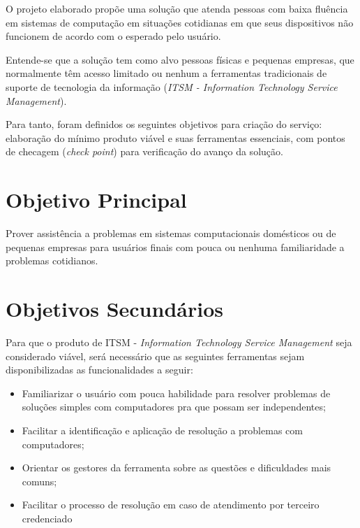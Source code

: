 \documentclass[
    12pt,               %
    openright,          %
    oneside,
    a4paper,            %
    english,            %
    brazil              %
   ]{ifsp-spo-inf-ctds}
\begin{document}
	O projeto elaborado propõe uma solução que atenda pessoas com baixa fluência em sistemas de computação em situações cotidianas em que seus dispositivos não funcionem de acordo com o esperado pelo usuário.
	
	Entende-se que a solução tem como alvo pessoas físicas e pequenas empresas, que normalmente têm acesso limitado ou nenhum a ferramentas tradicionais de suporte de tecnologia da informação (\textit{ITSM - Information Technology Service Management}).
	
	Para tanto, foram definidos os seguintes objetivos para criação do serviço: elaboração do mínimo produto viável e suas ferramentas essenciais, com pontos de checagem (\textit{check point}) para verificação do avanço da solução.

\section{Objetivo Principal}

	Prover assistência a problemas em sistemas computacionais domésticos ou de pequenas empresas para usuários finais com pouca ou nenhuma familiaridade a problemas cotidianos.

\section{Objetivos Secundários}

	Para que o produto de ITSM - \textit{Information Technology Service Management} seja considerado viável, será necessário que as seguintes ferramentas sejam disponibilizadas as funcionalidades a seguir: 
	
	\begin{itemize}
		
		\item
		Familiarizar o usuário com pouca habilidade para resolver problemas de soluções simples com computadores pra que possam ser independentes;
		
		\item
		Facilitar a identificação e aplicação de resolução a problemas com computadores;
		
		\item
		Orientar os gestores da ferramenta sobre as questões e dificuldades mais comuns;
		
		\item 
		Facilitar o processo de resolução em caso de atendimento por terceiro credenciado
		 
	\end{itemize}
\end{document}
